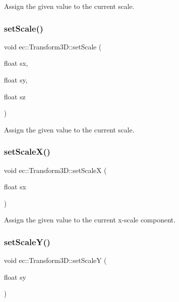 Assign the given value to the current scale. \mbox{\label{classec_1_1_transform3_d_a604f8cab4d669b713e04b57a7cc57c0c}} 
\subsubsection{\texorpdfstring{set\+Scale()}{setScale()}\hspace{0.1cm}{\footnotesize\ttfamily [2/2]}}
{\footnotesize\ttfamily void ec\+::\+Transform3\+D\+::set\+Scale (\begin{DoxyParamCaption}\item[{float}]{sx,  }\item[{float}]{sy,  }\item[{float}]{sz }\end{DoxyParamCaption})}

Assign the given value to the current scale. \mbox{\label{classec_1_1_transform3_d_ada2c6aded239ad20e1c155a5dee60506}} 
\subsubsection{\texorpdfstring{set\+Scale\+X()}{setScaleX()}}
{\footnotesize\ttfamily void ec\+::\+Transform3\+D\+::set\+ScaleX (\begin{DoxyParamCaption}\item[{float}]{sx }\end{DoxyParamCaption})}

Assign the given value to the current x-\/scale component. \mbox{\label{classec_1_1_transform3_d_a599ea97d84a88467abec94a30339f73e}} 
\subsubsection{\texorpdfstring{set\+Scale\+Y()}{setScaleY()}}
{\footnotesize\ttfamily void ec\+::\+Transform3\+D\+::set\+ScaleY (\begin{DoxyParamCaption}\item[{float}]{sy }\end{DoxyParamCaption})}

